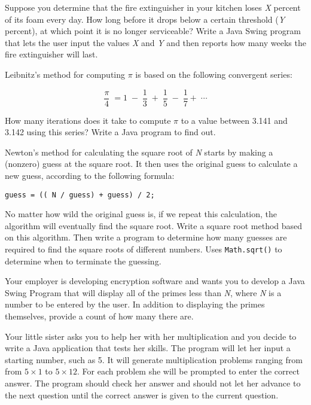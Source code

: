 \begin{EXRtwo}
\item  Suppose you determine that the fire extinguisher in your
kitchen loses {\it X} percent of its foam every day. How long before
it drops below a certain threshold ({\it Y} percent), at which point
it is no longer serviceable?  Write a Java Swing program that lets the user
input the values {\it X} and {\it Y} and then reports how many weeks
the fire extinguisher will last.

\item  Leibnitz's method for computing $\pi$ is based on the following
convergent series:

\begin{displaymath}
  \frac{\pi}{4} \; = 1 \; - \; \frac{1}{3} \; + \; \frac{1}{5} \; - \; \frac{1}{7} + \; \cdots
\end{displaymath}

\noindent How many iterations does it take to compute $\pi$ to 
a value between 3.141 and 3.142 using this series? Write a Java
program to find out.

\item  Newton's method for calculating the square root of {\it N} starts
by making a (nonzero) guess at the square root. It then
uses the original guess to calculate a new guess, according to
the following formula:

\begin{jjjlisting}
\begin{lstlisting}
guess = (( N / guess) + guess) / 2;
\end{lstlisting}
\end{jjjlisting}

\noindent No matter how wild the original guess is, if we repeat
this calculation, the algorithm will eventually find the square
root.  Write a square root method based on this algorithm. Then write
a program to determine how many guesses are required to find the
square roots of different numbers. Uses {\tt Math.sqrt()} to determine
when to terminate the guessing.

\item  Your employer is developing encryption software and wants you
to develop a Java Swing Program that will display all of the primes less than
{\it N}, where {\it N} is a number to be entered by the user. In
addition to displaying the primes themselves, provide a count of how
many there are. 

\item  Your little sister asks you to help her with her
multiplication and you decide to write a Java application that tests
her skills. The program will let her input a starting number, such as
5. It will generate multiplication problems ranging from from $5
\times 1$ to $5 \times 12$. For each problem she will be prompted to
enter the correct answer. The program should check her answer and
should not let her advance to the next question until the correct
answer is given to the current question.


\end{EXRtwo}
